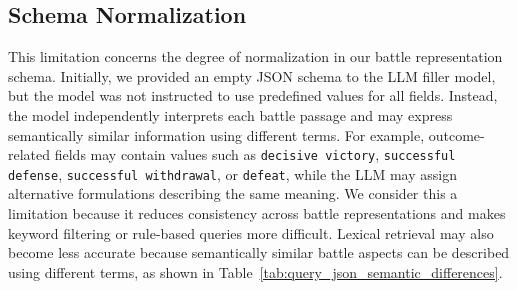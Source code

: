 \subsection{Schema Normalization}
This limitation concerns the degree of normalization in our battle representation schema. Initially, we provided an empty JSON schema to the LLM filler model, but the model was not instructed to use predefined values for all fields. Instead, the model independently interprets each battle passage and may express semantically similar information using different terms. For example, outcome-related fields may contain values such as \texttt{decisive victory}, \texttt{successful defense}, \texttt{successful withdrawal}, or \texttt{defeat}, while the LLM may assign alternative formulations describing the same meaning. We consider this a limitation because it reduces consistency across battle representations and makes keyword filtering or rule-based queries more difficult. Lexical retrieval may also become less accurate because semantically similar battle aspects can be described using different terms, as shown in Table~\ref{tab:query_json_semantic_differences}.

